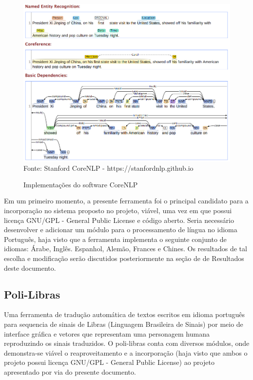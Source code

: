 \begin{figure}[H]
\centering
\caption{Implementações do software CoreNLP} %
\includegraphics[scale=0.4]{03}\\  %
{\small Fonte: Stanford CoreNLP - https://stanfordnlp.github.io} %
\label{fig:exemplo} %
\end{figure}

Em um primeiro momento, a presente ferramenta foi o principal candidato para a incorporação no sistema proposto no projeto, viável, uma vez em que possui licença GNU/GPL - General Public License e código aberto. Seria necessário desenvolver e adicionar um módulo para o processamento de língua no idioma Português, haja visto que a ferramenta implementa o seguinte conjunto de idiomas: Árabe, Inglês. Espanhol, Alemão, Frances e Chines. Os resultados de tal escolha e modificação serão discutidos posteriormente na seção de de Resultados deste documento.

\subsection{Poli-Libras}
Uma ferramenta de tradução automática de textos escritos em idioma português para sequencia de sinais de Libras (Linguagem Brasileira de Sinais) por meio de interface gráfica e vetores que representam uma personagem humana reproduzindo os sinais traduzidos. O poli-libras conta com diversos módulos, onde demonstra-se viável o reaproveitamento e a incorporação (haja visto que ambos o projeto possui licença GNU/GPL - General Public License) ao projeto apresentado por via do presente documento.

